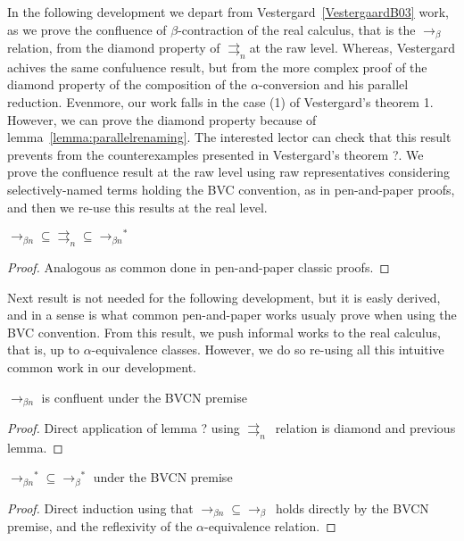 \documentclass{article}
\newcommand{\alp}{\ensuremath{\alpha}}
\newcommand{\pn}{\ensuremath{\rightrightarrows_n}}
\newcommand{\betar}{\ensuremath{\rightarrow_{\beta}}}
\newcommand{\betarn}{\ensuremath{\rightarrow_{\beta n}}}
\begin{document}
In the following development we depart from Vestergard~\ref{VestergaardB03} work, as we prove the confluence of $\beta$-contraction of the real calculus, that is the \betar relation, from the diamond property of \pn at the raw level. Whereas, Vestergard achives the same confuluence result, but from the more complex proof of the diamond property of the composition of the \alp-conversion and his parallel reduction.  Evenmore, our work falls in the case (1) of Vestergard's theorem 1. However, we can prove the diamond property because of lemma~\ref{lemma:parallelrenaming}. The interested lector can check that this result prevents from the counterexamples presented in Vestergard's theorem ?. We prove the confluence result at the raw level using raw representatives considering selectively-named terms holding the BVC convention, as in pen-and-paper proofs, and then we re-use this results at the real level. 

\begin{lemma}{$\betarn \subseteq \pn \subseteq \betarn^*$}
\label{lemma:rawinclusions}
 \end{lemma}

\begin{proof}
  Analogous as common done in pen-and-paper classic proofs.
\end{proof}

Next result is not needed for the following development, but it is easly derived, and in a sense is what common pen-and-paper works usualy prove when using the BVC convention. From this result, we push informal works to the real calculus, that is, up to \alp-equivalence classes. However, we do so re-using all this intuitive common work in our development.

\begin{lemma}{$\betarn$ is confluent under the BVCN premise}
\label{lemma:betaconf}
 \end{lemma}

 \begin{proof}
   Direct application of lemma ? using \pn\ relation is diamond and previous lemma.   
\end{proof}


 \begin{lemma}{$\betarn^*  \subseteq \betar^*$ under the BVCN premise}
 \end{lemma}

\begin{proof}
  Direct induction using that $\betarn  \subseteq \betar$\ holds directly by the BVCN premise, and the reflexivity of the \alp-equivalence relation.
\end{proof}
 
\end{document}
